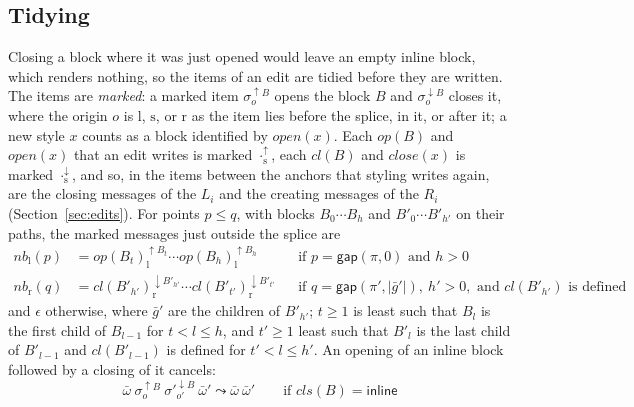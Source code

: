 \documentclass[11pt]{article}
\numberwithin{equation}{section}
\newcommand{\kw}[1]{\ensuremath{\mathsf{#1}}}
\begin{document}
\subsection{Tidying}

Closing a block where it was just opened would leave an empty inline
block, which renders nothing, so the items of an edit are tidied before
they are written.  The items are \emph{marked}: a marked item
$\sigma^{\uparrow B}_{o}$ opens the block $B$ and $\sigma^{\downarrow
B}_{o}$ closes it, where the origin $o$ is $\mathrm{l}$, $\mathrm{s}$, or
$\mathrm{r}$ as the item lies before the splice, in it, or after it; a new
style $x$ counts as a block identified by $\mathit{open}(x)$.  Each
$\mathit{op}(B)$ and $\mathit{open}(x)$ that an edit writes is marked
$\cdot^{\uparrow}_{\mathrm{s}}$, each $\mathit{cl}(B)$ and
$\mathit{close}(x)$ is marked $\cdot^{\downarrow}_{\mathrm{s}}$, and so, in
the items between the anchors that styling writes again, are the closing
messages of the $L_i$ and the creating messages of the $R_i$
(Section~\ref{sec:edits}).  For points $p \le q$, with blocks $B_0 \cdots
B_h$ and $B'_0 \cdots B'_{h'}$ on their paths, the marked messages just
outside the splice are
\begin{equation}\label{eq:tidy-neighbours}
\begin{aligned}
\mathit{nb}_{\mathrm{l}}(p) &= \mathit{op}(B_t)^{\uparrow B_t}_{\mathrm{l}}
  \cdots \mathit{op}(B_h)^{\uparrow B_h}_{\mathrm{l}}
  && \text{if } p = \kw{gap}(\pi, 0) \text{ and } h > 0 \\
\mathit{nb}_{\mathrm{r}}(q) &= \mathit{cl}(B'_{h'})^{\downarrow
  B'_{h'}}_{\mathrm{r}} \cdots \mathit{cl}(B'_{t'})^{\downarrow
  B'_{t'}}_{\mathrm{r}}
  && \text{if } q = \kw{gap}(\pi', |\bar g'|),\ h' > 0, \text{ and }
     \mathit{cl}(B'_{h'}) \text{ is defined}
\end{aligned}
\end{equation}
and $\epsilon$ otherwise, where $\bar g'$ are the children of $B'_{h'}$;
$t \ge 1$ is least such that $B_l$ is the first child of $B_{l-1}$ for $t <
l \le h$, and $t' \ge 1$ least such that $B'_l$ is the last child of
$B'_{l-1}$ and $\mathit{cl}(B'_{l-1})$ is defined for $t' < l \le h'$.  An
opening of an inline block followed by a closing of it cancels:
\begin{equation}\label{eq:tidy-cancel}
\bar\omega\ \sigma^{\uparrow B}_{o}\ \sigma'^{\downarrow B}_{o'}\
  \bar\omega' \leadsto \bar\omega\ \bar\omega'
\qquad \text{if } \mathit{cls}(B) = \kw{inline}
\end{equation}
\end{document}
